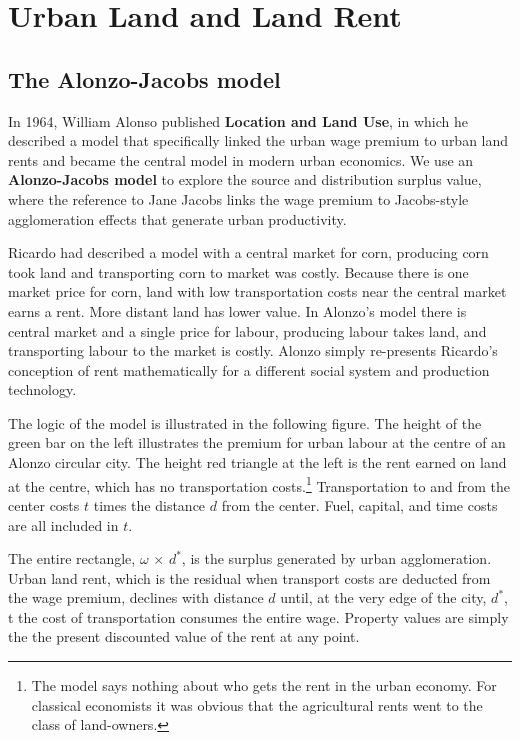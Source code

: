 \chapter{Urban Land and Land Rent}

\section{The Alonzo-Jacobs model}
In 1964, William Alonso published \textbf{Location and Land Use}, in which he described a model that specifically linked the urban wage premium to urban land rents and  became the central model in modern urban economics. 
We use an \textbf{Alonzo-Jacobs model} to explore the source and distribution surplus value, where the reference to Jane Jacobs links the wage premium to Jacobs-style  agglomeration effects that generate urban productivity.%

Ricardo had described a model with a central market for corn, producing corn took land and transporting corn to market was costly. Because there is one market price for corn, land with low transportation costs near the central market earns a rent. More distant land has lower value. In Alonzo's model there is central market and a single price for labour, producing labour takes land, and transporting labour to the market is costly. Alonzo simply re-presents Ricardo's conception of rent  mathematically for a different social system and production technology.  

The logic of the model is illustrated in the following figure. The height of the green bar on the left illustrates the premium for urban labour at the centre of an Alonzo circular city. The height red triangle at the left is the rent earned on land at the centre, which has no transportation costs.\footnote{The model says nothing about who gets the rent in the urban economy. For classical economists it was obvious that the agricultural rents went to the class of land-owners.} Transportation to and from the center costs $t$ times the distance $d$ from the center. Fuel, capital, and time costs are  all included in $t$. 


\begin{figure}
    \begin{center}
    
    \caption{}
    \label{fig:city_simple_alonzo}
    \end{center}
\end{figure}


The entire rectangle, $\omega$ $\times$ $d^*$, is the surplus generated by urban agglomeration. Urban land rent, which is the residual when transport costs are deducted from the wage premium, declines  with distance $d$ until, at the very edge of the city, $d^*$, t the cost of transportation  consumes the entire wage. Property values are simply the the present discounted value of the rent at any point.

